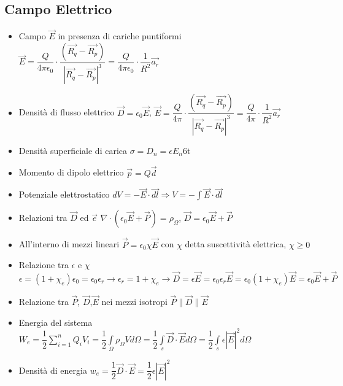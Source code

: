 \documentclass{article}
\begin{document}
\subsection{Campo Elettrico}
\begin{itemize}
	\item Campo \(\vec{E}\) in presenza di cariche puntiformi \( \vec{E} = \dfrac{Q}{4 \pi \epsilon_0} \cdot \dfrac{(\vec{R_q} - \vec{R_p})}{| \vec{R_q} - \vec{R_p} | ^3 } = \dfrac{Q}{4 \pi \epsilon_0} \cdot \dfrac{1}{R^2} \vec{a_r} \)
	\item Densità di flusso elettrico \( \vec{D} = \epsilon_0 \vec{E} \),  \( \vec{E} = \dfrac{Q}{4 \pi} \cdot \dfrac{(\vec{R_q} - \vec{R_p})}{| \vec{R_q} - \vec{R_p} | ^3 } = \dfrac{Q}{4 \pi} \cdot \dfrac{1}{R^2} \vec{a_r} \)
	\item Densità superficiale di carica \( \sigma = D_n = \epsilon E_n \)6t
	\item Momento di dipolo elettrico \( \vec{p} = Q \vec{d} \)
	\item Potenziale elettrostatico \(\displaystyle dV = -\vec{E} \cdot \vec{dl} \Rightarrow V = -\int{\vec{E} \cdot \vec{dl}} \)
	\item Relazioni tra \(\vec{D}\) ed \(\vec{e}\) \( \nabla \cdot (\epsilon_0 \vec{E} + \vec{P} ) = \rho_\Omega \), \( \vec{D} = \epsilon_0 \vec{E} + \vec{P} \)
	\item All'interno di mezzi lineari \(\vec{P} = \epsilon_0 \chi \vec{E} \) con \(\chi\) detta suscettività elettrica, \(\chi \geq  0\)
	\item Relazione tra \(\epsilon\) e \(\chi\) \(\epsilon = (1 + \chi_e) \epsilon_0 = \epsilon_0 \epsilon_r \rightarrow \epsilon_r = 1 + \chi_e \rightarrow \vec{D} = \epsilon \vec{E} = \epsilon_0 \epsilon_r \vec{E} = \epsilon_0 (1 + \chi_e) \vec{E} = \epsilon_0 \vec{E} + \vec{P} \)
	\item Relazione tra \(\vec{P}\), \(\vec{D}\),\(\vec{E}\) nei mezzi isotropi \(\vec{P}\|\vec{D}\|\vec{E}\)
	\item Energia del sistema \(\displaystyle W_e = \dfrac{1}{2} \sum\limits_{i=1}^{n}Q_iV_i = \dfrac{1}{2} \int\limits_\Omega \rho_\Omega V d\Omega = \dfrac{1}{2} \int\limits_{s} \vec{D} \cdot \vec{E} d\Omega = \dfrac{1}{2} \int\limits_{s} \epsilon |\vec{E}|^2 d\Omega \)
	\item Densità di energia \( w_e = \dfrac{1}{2} \vec{D} \cdot \vec{E} = \dfrac{1}{2} \epsilon |\vec{E}|^2 \)
\end{itemize}
\end{document}
